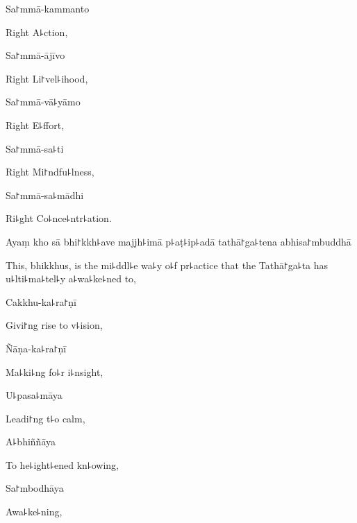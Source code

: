 \ifaivedition
\clearpage
\fi

Sa꜓mmā-kammanto

\begin{english}
  Right A꜕ction,
\end{english}

Sa꜓mmā-ājīvo

\begin{english}
  Right Li꜓vel꜕ihood,
\end{english}

Sa꜓mmā-vā꜕yāmo

\begin{english}
  Right E꜕ffort,
\end{english}

Sa꜓mmā-sa꜕ti

\begin{english}
  Right Mi꜓ndfu꜕lness,
\end{english}

Sa꜓mmā-sa꜕mādhi

\begin{english}
  Ri꜕ght Co꜕nce꜕ntr꜕ation.
\end{english}

Ayaṃ kho sā bhi꜓kkh꜕ave majjh꜕imā p꜕aṭ꜕ip꜕adā tathā꜓ga꜕tena abhisa꜓mbuddhā

\begin{english}
  This, bhikkhus, is the mi꜕ddl꜕e wa꜕y o꜕f pr꜕actice that the
  Tathā꜓ga꜕ta has u꜕lti꜕ma꜕tel꜕y a꜕wa꜕ke꜕ned to,
\end{english}

Cakkhu-ka꜕ra꜓ṇī

\begin{english}
  Givi꜓ng rise to v꜕ision,
\end{english}

Ñāṇa-ka꜕ra꜓ṇī

\begin{english}
  Ma꜕ki꜕ng fo꜕r i꜕nsight,
\end{english}

U꜕pasa꜕māya

\begin{english}
  Leadi꜓ng t꜕o calm,
\end{english}

A꜕bhiññāya

\begin{english}
  To he꜕ight꜕ened kn꜕owing,
\end{english}

Sa꜓mbodhāya

\begin{english}
  Awa꜕ke꜕ning,
\end{english}

